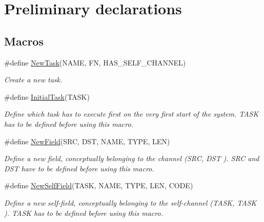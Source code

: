 \hypertarget{group__interpow__declaration}{}\section{Preliminary declarations}
\label{group__interpow__declaration}
\subsection*{Macros}
\begin{DoxyCompactItemize}
\item 
\#define \hyperlink{group__interpow__declaration_gaf3547b2fb7ca0e0fe642e6b5cbdbdaf2}{New\+Task}(N\+A\+ME,  FN,  H\+A\+S\+\_\+\+S\+E\+L\+F\+\_\+\+C\+H\+A\+N\+N\+EL)
\begin{DoxyCompactList}\small\item\em Create a new task. \end{DoxyCompactList}\item 
\#define \hyperlink{group__interpow__declaration_ga1156bffe7de2162c5889cf427dd30657}{Initial\+Task}(T\+A\+SK)
\begin{DoxyCompactList}\small\item\em Define which task has to execute first on the very first start of the system. {\itshape T\+A\+SK} has to be defined before using this macro. \end{DoxyCompactList}\item 
\#define \hyperlink{group__interpow__declaration_gafcc1282442066a75e573d78ae3b6dac1}{New\+Field}(S\+RC,  D\+ST,  N\+A\+ME,  T\+Y\+PE,  L\+EN)
\begin{DoxyCompactList}\small\item\em Define a new field, conceptually belonging to the channel ({\itshape S\+RC}, {\itshape D\+ST} ). {\itshape S\+RC} and {\itshape D\+ST} have to be defined before using this macro. \end{DoxyCompactList}\item 
\#define \hyperlink{group__interpow__declaration_ga224e55a4652c727d23a3301b314398bd}{New\+Self\+Field}(T\+A\+SK,  N\+A\+ME,  T\+Y\+PE,  L\+EN,  C\+O\+DE)
\begin{DoxyCompactList}\small\item\em Define a new self-\/field, conceptually belonging to the self-\/channel ({\itshape T\+A\+SK}, {\itshape T\+A\+SK} ). {\itshape T\+A\+SK} has to be defined before using this macro. \end{DoxyCompactList}\end{DoxyCompactItemize}


